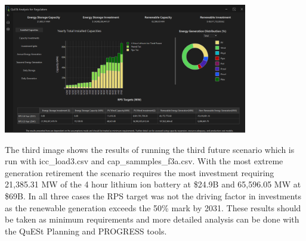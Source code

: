 \documentclass{article}
\begin{document}
\begin{center}
    \includegraphics[width=0.8\textwidth]{pics/results_3.PNG}
\end{center}
The third image shows the results of running the third future scenario which is run with icc\_load3.csv and cap\_sammples\_f3a.csv. With the most extreme generation retirement the scenario requires the most investment requiring 21,385.31 MW of the 4 hour lithium ion battery at \$24.9B and 65,596.05 MW at \$69B. In all three cases the RPS target was not the driving factor in investments as the renewable generation exceeds the 50\% mark by 2031. These results should be taken as minimum requirements and more detailed analysis can be done with the QuESt Planning and PROGRESS tools.
\end{document}
